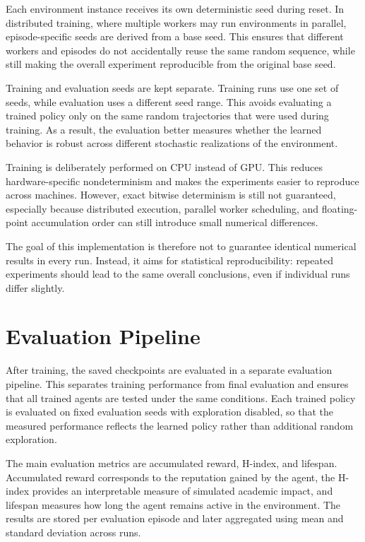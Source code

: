 \documentclass[english,bachelor]{hsluthesis}
\begin{document}
Each environment instance receives its own deterministic seed during reset. In distributed training, where multiple workers may run environments in parallel, episode-specific seeds are derived from a base seed. This ensures that different workers and episodes do not accidentally reuse the same random sequence, while still making the overall experiment reproducible from the original base seed.

Training and evaluation seeds are kept separate. Training runs use one set of seeds, while evaluation uses a different seed range. This avoids evaluating a trained policy only on the same random trajectories that were used during training. As a result, the evaluation better measures whether the learned behavior is robust across different stochastic realizations of the environment.

Training is deliberately performed on CPU instead of GPU. This reduces hardware-specific nondeterminism and makes the experiments easier to reproduce across machines. However, exact bitwise determinism is still not guaranteed, especially because distributed execution, parallel worker scheduling, and floating-point accumulation order can still introduce small numerical differences.

The goal of this implementation is therefore not to guarantee identical numerical results in every run. Instead, it aims for statistical reproducibility: repeated experiments should lead to the same overall conclusions, even if individual runs differ slightly.


\section{Evaluation Pipeline}

After training, the saved checkpoints are evaluated in a separate evaluation pipeline. This separates training performance from final evaluation and ensures that all trained agents are tested under the same conditions. Each trained policy is evaluated on fixed evaluation seeds with exploration disabled, so that the measured performance reflects the learned policy rather than additional random exploration.

The main evaluation metrics are accumulated reward, H-index, and lifespan. Accumulated reward corresponds to the reputation gained by the agent, the H-index provides an interpretable measure of simulated academic impact, and lifespan measures how long the agent remains active in the environment. The results are stored per evaluation episode and later aggregated using mean and standard deviation across runs.
\end{document}
